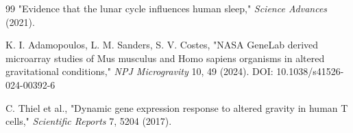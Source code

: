 \documentclass[11pt,a4paper]{article}
\theoremstyle{remark}
\begin{document}
\begin{thebibliography}{99}
		"Evidence that the lunar cycle influences human sleep," \emph{Science Advances} (2021).
		
		K. I. Adamopoulos, L. M. Sanders, S. V. Costes, "NASA GeneLab derived microarray studies of Mus musculus and Homo sapiens organisms in altered gravitational conditions," \emph{NPJ Microgravity} 10, 49 (2024). DOI: 10.1038/s41526-024-00392-6
		
		C. Thiel et al., "Dynamic gene expression response to altered gravity in human T cells," \emph{Scientific Reports} 7, 5204 (2017).
		
	\end{thebibliography}
	
\end{document}
